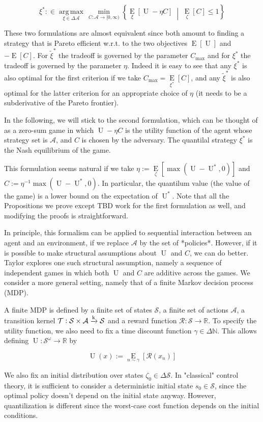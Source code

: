 \documentclass[a4paper]{article}
\newcommand{\AP}[1]{\left(#1\right)}
\newcommand{\AB}[1]{\left[#1\right]}
\newcommand{\ACM}[2]{\left\{#1\;\middle\vert\;#2\right\}}
\newcommand{\Ea}[2]{\underset{#1}{\operatorname{E}}\AB{#2}}
\newcommand{\Argmax}[1]{\underset{#1}{\operatorname{arg\,max}}\,}
\newcommand{\Nats}{\mathbb{N}}
\newcommand{\Reals}{\mathbb{R}}
\newcommand{\K}{\xrightarrow{\textnormal{k}}}
\newcommand{\A}{\mathcal{A}}
\newcommand{\St}{\mathcal{S}}
\newcommand{\T}{\mathcal{T}}
\newcommand{\R}{\mathcal{R}}
\newcommand{\Ut}{\operatorname{U}}
\newcommand{\Co}{C}
\begin{document}
$$\xi^* :\in \Argmax{\xi \in \Delta\A}\min_{\Co:\A\rightarrow[0,\infty)}\ACM{\Ea{\xi}{\Ut-\eta \Co}}{\Ea{\zeta}{\Co} \leq 1}$$

These two formulations are almost equivalent since both amount to finding a strategy that is Pareto efficient w.r.t. to the two objectives $\Ea{}{\Ut}$ and $-\Ea{}{\Co}$. For $\tilde{\xi}^*$ the tradeoff is governed by the parameter $C_{\max}$ and for $\xi^*$ the tradeoff is governed by the parameter $\eta$. Indeed it is easy to see that any $\xi^*$ is also optimal for the first criterion if we take $C_{\max}=\Ea{\xi^*}{\Co}$, and any $\tilde{\xi}^*$ is also optimal for the latter criterion for an appropriate choice of $\eta$ (it needs to be a subderivative of the Pareto frontier).

In the following, we will stick to the second formulation, which can be thought of as a zero-sum game in which $\Ut-\eta \Co$ is the utility function of the agent whose strategy set is $\A$, and $\Co$ is chosen by the adversary. The quantilal strategy $\xi^*$ is the Nash equilibrium of the game.

This formulation seems natural if we take $\eta:=\Ea{\zeta}{\max\AP{\Ut-\Ut^*,0}}$ and $\Co:=\eta^{-1}\max\AP{\Ut-\Ut^*,0}$. In particular, the quantilum value (the value of the game) is a lower bound on the expectation of $\Ut^*$. Note that all the Propositions we prove except TBD work for the first formulation as well, and modifying the proofs is straightforward.

In principle, this formalism can be applied to sequential interaction between an agent and an environment, if we replace $\A$ by the set of *policies*. However, if it is possible to make structural assumptions about $\Ut$ and $C$, we can do better. Taylor explores one such structural assumption, namely a sequence of independent games in which both $\Ut$ and $\Co$ are additive across the games. We consider a more general setting, namely that of a finite Markov decision process (MDP).

A finite MDP is defined by a finite set of states $\St$, a finite set of actions $\A$, a transition kernel $\T: \St \times \A \K \St$ and a reward function $\R: \St \rightarrow \Reals$. To specify the utility function, we also need to fix a time discount function $\gamma \in \Delta\Nats$. This allows defining $\Ut: \St^\omega \rightarrow \Reals$ by

$$\Ut(x):=\Ea{n\sim\gamma}{\R\AP{x_n}}$$

We also fix an initial distribution over states $\zeta_0 \in \Delta \St$. In "classical" control theory, it is sufficient to consider a deterministic initial state $s_0 \in \St$, since the optimal policy doesn't depend on the initial state anyway. However, quantilization is different since the worst-case cost function depends on the initial conditions.
\end{document}
